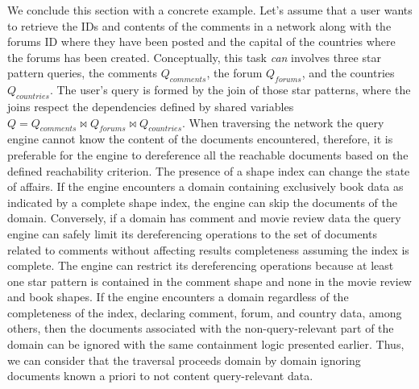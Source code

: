 We conclude this section with a concrete example.
Let's assume that a user wants to retrieve the IDs and contents of the comments in a network along with the forums ID where they have been posted and the capital of the countries where the forums has been created.
Conceptually, this task \emph{can} involves three star pattern queries, the comments $ Q_{comments}$, the forum $Q_{forums}$, and the countries $Q_{countries}$.
The user's query is formed by the join of those star patterns, where the joins respect the dependencies defined by shared variables $Q = Q_{comments} \bowtie Q_{forums} \bowtie Q_{countries}$. 
When traversing the network the query engine cannot know the content of the documents encountered, therefore, it is preferable for the engine to dereference all the reachable documents based on the defined reachability criterion.
The presence of a shape index can change the state of affairs.
If the engine encounters a domain containing exclusively book data as indicated by a complete shape index, the engine can skip the documents of the domain. 
Conversely, if a domain has comment and movie review data the query engine can safely limit its dereferencing operations to the set of documents related to comments without affecting results completeness assuming the index is complete.
The engine can restrict its dereferencing operations because at least one star pattern is contained in the comment shape and none in the movie review and book shapes.
If the engine encounters a domain regardless of the completeness of the index, declaring comment, forum, and country data, among others, then the documents associated with the non-query-relevant part of the domain can be ignored with the same containment logic presented earlier.
Thus, we can consider that the traversal proceeds domain by domain ignoring documents known a priori to not content query-relevant data.
